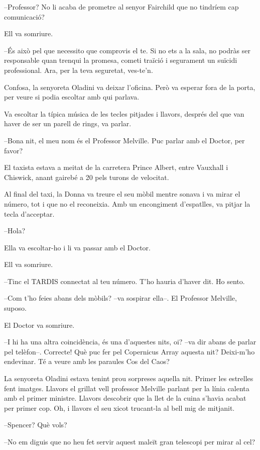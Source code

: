 --Professor? No li acaba de prometre al senyor Fairchild que no tindríem
cap comunicació?

Ell va somriure.

--És això pel que necessito que comprovis el te. Si no ets a la sala, no
podràs ser responsable quan trenqui la promesa, cometi traïció i
segurament un suïcidi professional. Ara, per la teva seguretat,
ves-te'n.

Confosa, la senyoreta Oladini va deixar l'oficina. Però va esperar fora
de la porta, per veure si podia escoltar amb qui parlava.

Va escoltar la típica música de les tecles pitjades i llavors, després
del que van haver de ser un parell de rings, va parlar.

--Bona nit, el meu nom és el Professor Melville. Puc parlar amb el
Doctor, per favor?

El taxista estava a meitat de la carretera Prince Albert, entre Vauxhall
i Chiswick, anant gairebé a 20 pels turons de velocitat.

Al final del taxi, la Donna va treure el seu mòbil mentre sonava i va
mirar el número, tot i que no el reconeixia. Amb un encongiment
d'espatlles, va pitjar la tecla d'acceptar.

--Hola?

Ella va escoltar-ho i li va passar amb el Doctor.

Ell va somriure.

--Tinc el TARDIS connectat al teu número. T'ho hauria d'haver dit. Ho
sento.

--Com t'ho feies abans dels mòbils? --va sospirar ella--. El Professor
Melville, suposo.

El Doctor va somriure.

--I hi ha una altra coincidència, és una d'aquestes nits, oi? --va dir
abans de parlar pel telèfon--. Correcte! Què puc fer pel Copernicus
Array aquesta nit? Deixi-m'ho endevinar. Té a veure amb les paraules Cos
del Caos?

La senyoreta Oladini estava tenint prou sorpreses aquella nit. Primer
les estrelles fent imatges. Llavors el grillat vell professor Melville
parlant per la línia calenta amb el primer ministre. Llavors descobrir
que la llet de la cuina s'havia acabat per primer cop. Oh, i llavors el
seu xicot trucant-la al bell mig de mitjanit.

--Spencer? Què vols?

--No em diguis que no heu fet servir aquest maleït gran telescopi per
mirar al cel?

